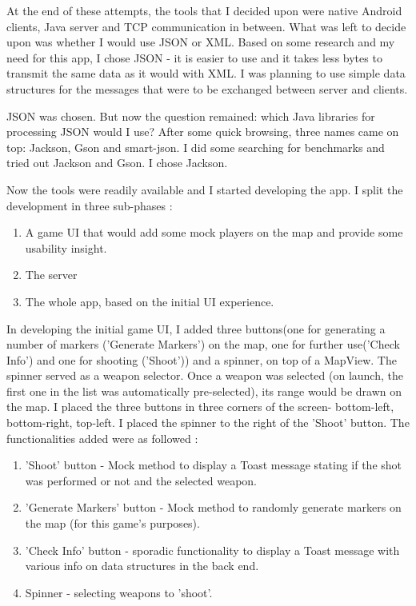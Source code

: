 \documentclass{article}
\begin{document}
At the end of these attempts, the tools that I decided upon were native Android
clients, Java server and TCP communication in between. What was left to decide
upon was whether I would use JSON or XML. Based on some research and my need for
this app, I chose JSON - it is easier to use and it takes less bytes to transmit
the same data as it would with XML. I was planning to use simple data structures
for the messages that were to be exchanged between server and clients.\newline

JSON was chosen. But now the question remained: which Java libraries for
processing JSON would I use? After some quick browsing, three names came on top:
Jackson, Gson and smart-json. I did some searching for benchmarks and tried out
Jackson and Gson. I chose Jackson.\newline

Now the tools were readily available and I started developing the app. I split
the development in three sub-phases : 
\begin{enumerate}
  \item A game UI that would add some mock players on the map and provide some
  usability insight.
  \item The server
  \item The whole app, based on the initial UI experience.
\end{enumerate}

In developing the initial game UI, I added three buttons(one for generating a
number of markers ('Generate Markers') on the map, one for further use('Check
Info') and one for shooting ('Shoot')) and a spinner, on top of a MapView. The
spinner served as a weapon selector. Once a weapon was selected (on launch, the
first one in the list was automatically pre-selected), its range would be
drawn on the map. I placed the three buttons in three corners of the screen-
bottom-left, bottom-right, top-left. I placed the spinner to the right of the
'Shoot' button. The functionalities added were as followed :

\begin{enumerate}
  \item 'Shoot' button - Mock method to display a Toast message stating if the
  shot was performed or not and the selected weapon.
  
  \item 'Generate Markers' button - Mock method to randomly generate markers on
  the map (for this game's purposes).
  
  \item 'Check Info' button - sporadic functionality to display a Toast message
  with various info on data structures in the back end.
  
  \item Spinner - selecting weapons to 'shoot'. 
\end{enumerate}
\end{document}
